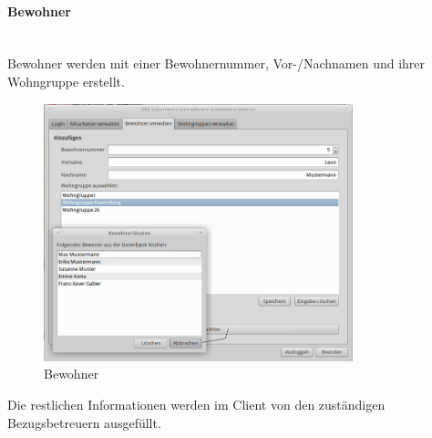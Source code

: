 \paragraph{Bewohner}\mbox{}\\
Bewohner werden mit einer Bewohnernummer, Vor-/Nachnamen und ihrer Wohngruppe  erstellt. 
\begin{figure}[h]
	\begin{center}
		\includegraphics[keepaspectratio=true, width=0.8\textwidth]{pics/admin2.png}
		\caption{Bewohner}
	\end{center}
\end{figure}
\FloatBarrier
\noindent
Die restlichen Informationen werden im Client von den zuständigen Bezugsbetreuern ausgefüllt.
\newpage
\noindent

